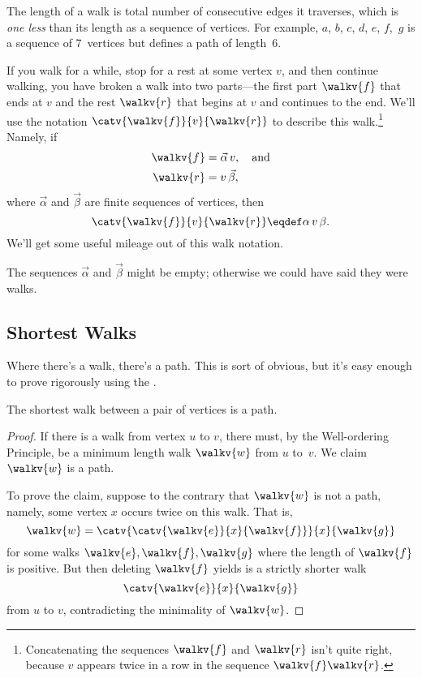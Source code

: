 The length of a walk is total number of consecutive edges it traverses,
which is \emph{one less} than its length as a sequence of vertices.  For
example, $a$, $b$, $c$, $d$, $e$, $f$,~$g$ is a sequence of 7~vertices but
defines a path of length~6.

If you walk for a while, stop for a rest at some vertex $v$, and then
continue walking, you have broken a walk into two parts---the first part
$\walkv{f}$ that ends at $v$ and the rest $\walkv{r}$ that begins at $v$
and continues to the end.  We'll use the notation $\catv{\walkv{f}}{v}{\walkv{r}}$
to describe this walk.\footnote{Concatenating the sequences $\walkv{f}$
  and $\walkv{r}$ isn't quite right, because $v$ appears
  twice in a row in the sequence $\walkv{f}\walkv{r}$.} Namely, if
\begin{align*}
\walkv{f} & = \vec{\alpha}\,v,\quad \text{and}\\
\walkv{r} & = v\,\vec{\beta},
\end{align*}
where $\vec{\alpha}$ and $\vec{\beta}$ are finite sequences of vertices,
then
\[
\catv{\walkv{f}}{v}{\walkv{r}} \eqdef \alpha\, v\, \beta.
\]
We'll get some useful mileage out of this walk notation. \smiley

\begin{editingnotes}
The sequences $\vec{\alpha}$ and $\vec{\beta}$ might be empty; otherwise
we could have said they were walks.
\end{editingnotes}

\subsection{Shortest Walks }

Where there's a walk, there's a path.  This is sort of obvious, but
it's easy enough to prove rigorously using the .

\begin{lemma}\label{simplepath}
The shortest walk between a pair of vertices is a path.
\end{lemma}

\begin{proof}
  If there is a walk from vertex $u$ to $v$, there must, by the
  Well-ordering Principle, be a minimum length walk $\walkv{w}$ from $u$
  to~$v$.  We claim $\walkv{w}$ is a path.

  To prove the claim, suppose to the contrary that $\walkv{w}$ is not a
  path, namely, some vertex $x$ occurs twice on this walk.  That is,
\[
\walkv{w} = \catv{\catv{\walkv{e}}{x}{\walkv{f}}}{x}{\walkv{g}}
\]
for some walks $\walkv{e}, \walkv{f}, \walkv{g}$ where the length of
$\walkv{f}$ is positive.  But then deleting $\walkv{f}$ yields is a
strictly shorter walk
\[
\catv{\walkv{e}}{x}{\walkv{g}}
\]
from $u$ to $v$, contradicting the minimality of $\walkv{w}$.
\end{proof}


